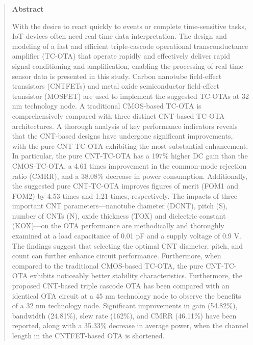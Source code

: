 \begin{abstract}
  \noindent\textbf{Abstract}\par\vspace{0.5em}
  With the desire to react quickly to events or complete time-sensitive tasks,
  IoT devices often need real-time data interpretation. The design and modeling
  of a fast and efficient triple-cascode operational transconductance amplifier
  (TC-OTA) that operate rapidly and effectively deliver rapid signal
  conditioning and amplification, enabling the processing of real-time sensor
  data is presented in this study. Carbon nanotube field-effect transistors
  (CNTFETs) and metal oxide semiconductor field-effect transistor (MOSFET) are
  used to implement the suggested TC-OTAs at 32 nm technology node. A
  traditional CMOS-based TC-OTA is comprehensively compared with three distinct
  CNT-based TC-OTA architectures. A thorough analysis of key performance
  indicators reveals that the CNT-based designs have undergone significant
  improvements, with the pure CNT-TC-OTA exhibiting the most substantial
  enhancement. In particular, the pure CNT-TC-OTA has a 197\% higher DC gain
  than the CMOS-TC-OTA, a 4.61 times improvement in the common-mode rejection
  ratio (CMRR), and a 38.08\% decrease in power consumption. Additionally, the
  suggested pure CNT-TC-OTA improves figures of merit (FOM1 and FOM2) by 4.53
  times and 1.21 times, respectively. The impacts of three important CNT
  parameters—nanotube diameter (DCNT), pitch (S), number of CNTs (N), oxide
  thickness (TOX) and dielectric constant (KOX)—on the OTA performance are
  methodically and thoroughly examined at a load capacitance of 0.01 pF and a
  supply voltage of 0.9 V. The findings suggest that selecting the optimal CNT
  diameter, pitch, and count can further enhance circuit performance.
  Furthermore, when compared to the traditional CMOS-based TC-OTA, the pure
  CNT-TC-OTA exhibits noticeably better stability characteristics. Furthermore,
  the proposed CNT-based triple cascode OTA has been compared with an identical
  OTA circuit at a 45 nm technology node to observe the benefits of a 32 nm
  technology node. Significant improvements in gain (54.82\%), bandwidth
  (24.81\%), slew rate (162\%), and CMRR (46.11\%) have been reported, along
  with a 35.33\% decrease in average power, when the channel length in the
  CNTFET-based OTA is shortened.
\end{abstract}